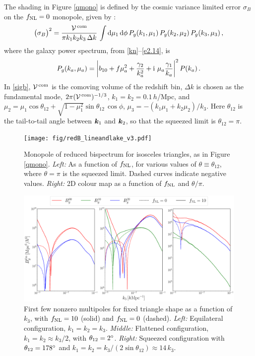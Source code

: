 {{{The shading in Figure \ref{qmono} is defined by the {cosmic variance limited} error $\sigma_{B}$ on the $f_\text{NL}=0$ monopole, given by \cite{Gagrani:2016rfy}: 
\begin{equation}
{\big(\sigma_{B}\big)^2=\frac{{\cal V}^{\,\mathrm{com}}}{\pi k_1k_2 k_3\, \Delta k}\,
\int \mathrm{d}\mu_1\, \mathrm{d}\phi \,P_g(k_1,\mu_1) \,P_g(k_2,\mu_2)\, P_g(k_3,\mu_3)}
\,,\label{sigb}
\end{equation}
where the galaxy power spectrum, from \eqref{kn}--\eqref{e2.14}, is
\begin{equation}
{P_g(k_a,\mu_a)=  \left| b_{10}
+f\mu_a^2+ \frac{\gamma_2}{k_a^2} +{\mathrm{i\,}}\,\mu_a \frac{\gamma_1}{k_a}\right|^2P(k_a)}\,. \label{pg0}
\end{equation}
In \eqref{sigb}, ${\cal V}^{\,\mathrm{com}}$ is the comoving volume of the redshift bin, $\Delta k$ is chosen as the fundamental mode, $2\pi ({\cal V}^{\,\mathrm{com}})^{-1/3}$, $k_1=k_2=0.1\,h$/Mpc, and \cite{Clarkson:2018dwn} $\mu_2=\mu_1\cos\theta_{12}+\sqrt{1-\mu_1^2}\sin\theta_{12}\,\cos\phi$, $\mu_3=-(k_1\mu_1+k_2\mu_2)/k_3$. Here $\theta_{12}$ is the {tail-to-tail} angle between $\bm {k}_1$ and $\bm {k}_2$, so that the squeezed limit is $\theta_{12}=\pi$.


\begin{figure}[ht]
	\centering
	\texttt{[image: fig/redB\_lineandlake\_v3.pdf]}
\caption{Monopole of reduced bispectrum for isosceles triangles, as in Figure \ref{qmono}. {\em Left:} As a function of $f_\text{NL}$, for various values of $\theta\equiv\theta_{12}$, where $\theta=\pi$ is the squeezed limit. Dashed curves indicate negative values. {\em Right:} 2D colour map  as a function of $f_\text{NL}$ and $\theta/\pi$.}\label{rb2d}
\end{figure}
\begin{figure}[ht]
\centering
\includegraphics[width=\textwidth]{fig/multipoles_allpanels_v3.pdf}
\caption{First few nonzero multipoles for fixed triangle shape as a function of $k_3$, with {$f_\text{NL}=10$ (solid) and $f_\text{NL}=0$} (dashed).
{\em Left:} Equilateral configuration, $k_1=k_2=k_3$. {\em Middle:} Flattened configuration, $k_1=k_2\approx k_3/2$, with $\theta_{12}=2^\circ$. {\em Right:} Squeezed configuration with $\theta_{12}=178^\circ$ and $k_1=k_2=k_3/(2\sin \theta_{12})\approx 14\, k_3$.}
\label{eqfl}
\end{figure}

}}}
